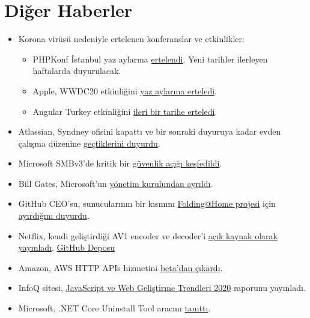\documentclass[11pt]{article}
\begin{document}
\section{Diğer Haberler}
\label{sec:orgb3b15ab}
\begin{itemize}
\item Korona virüsü nedeniyle ertelenen konferanslar ve etkinlikler:
\begin{itemize}
\item PHPKonf İstanbul yaz aylarına \href{https://2020.phpkonf.org/updates.html}{ertelendi}. Yeni tarihler ilerleyen
haftalarda duyurulacak.
\item Apple, WWDC20 etkinliğini \href{https://developer.apple.com/news/?id=03132020a}{yaz aylarına erteledi}.
\item Angular Turkey etkinliğini \href{https://twitter.com/ngTurkiye/status/1237659540889522176}{ileri bir tarihe erteledi}.
\end{itemize}
\item Atlassian, Syndney ofisini kapattı ve bir sonraki duyuruya kadar evden
çalışma düzenine \href{https://mobile.twitter.com/Atlassian/status/1237996563953324032}{geçtiklerini duyurdu}.
\item Microsoft SMBv3'de kritik bir \href{https://kb.cert.org/vuls/id/872016/}{güvenlik açığı keşfedildi}.
\item Bill Gates, Microsoft'un \href{https://www.prnewswire.com/news-releases/microsoft-announces-change-to-its-board-of-directors-301023293.html}{yönetim kurulundan ayrıldı}.
\item GitHub CEO'su, sunucularının bir kısmını \href{https://foldingathome.org/2020/02/27/foldinghome-takes-up-the-fight-against-covid-19-2019-ncov/}{Folding@Home projesi} için
\href{https://mobile.twitter.com/natfriedman/status/1237466267998543872}{ayırdığını duyurdu}.
\item Netflix, kendi geliştirdiği AV1 encoder ve decoder'i \href{https://netflixtechblog.com/svt-av1-an-open-source-av1-encoder-and-decoder-ad295d9b5ca2}{açık kaynak olarak
yayınladı}. \href{https://github.com/OpenVisualCloud/SVT-AV1/}{GitHub Deposu}
\item Amazon, AWS HTTP APIs hizmetini \href{https://aws.amazon.com/tr/blogs/compute/building-better-apis-http-apis-now-generally-available/}{beta'dan çıkardı}.
\item InfoQ sitesi, \href{https://www.infoq.com/articles/javascript-web-development-trends-2020/}{JavaScript ve Web Geliştirme Trendleri 2020} raporunu
yayınladı.
\item Microsoft, .NET Core Uninstall Tool aracını \href{https://devblogs.microsoft.com/dotnet/announcing-the-net-core-uninstall-tool-1-0/}{tanıttı}.

\end{itemize}
\end{document}
